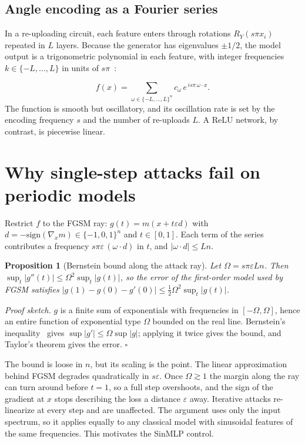 \documentclass[11pt]{article}
\newtheorem{proposition}{Proposition}
\begin{document}
\subsection{Angle encoding as a Fourier series}
In a re-uploading circuit, each feature enters through rotations $R_Y(s\pi x_i)$ repeated in $L$ layers. Because the generator has eigenvalues $\pm 1/2$, the model output is a trigonometric polynomial in each feature, with integer frequencies $k\in\{-L,\dots,L\}$ in units of $s\pi$~\cite{schuld2021}:

\begin{equation}
f(x)=\sum_{\omega\in\{-L,\dots,L\}^n} c_\omega\, e^{\,i s\pi\, \omega\cdot x}.
\end{equation}
The function is smooth but oscillatory, and its oscillation rate is set by the encoding frequency $s$ and the number of re-uploads $L$. A ReLU network, by contrast, is piecewise linear.

\section{Why single-step attacks fail on periodic models}\label{sec:theory}
Restrict $f$ to the FGSM ray: $g(t)=m(x+t\varepsilon d)$ with $d=-\mathrm{sign}(\nabla_x m)\in\{-1,0,1\}^n$ and $t\in[0,1]$. Each term of the series contributes a frequency $s\pi\varepsilon\,(\omega\cdot d)$ in $t$, and $|\omega\cdot d|\leq Ln$.

\begin{proposition}[Bernstein bound along the attack ray]
Let $\Omega=s\pi\varepsilon L n$. Then $\sup_t|g''(t)|\leq\Omega^2\sup_t|g(t)|$, so the error of the first-order model used by FGSM satisfies $|g(1)-g(0)-g'(0)|\leq\tfrac{1}{2}\Omega^2\sup_t|g(t)|$.
\end{proposition}
\emph{Proof sketch.} $g$ is a finite sum of exponentials with frequencies in $[-\Omega,\Omega]$, hence an entire function of exponential type $\Omega$ bounded on the real line. Bernstein's inequality~\cite{boas1954} gives $\sup|g'|\leq\Omega\sup|g|$; applying it twice gives the bound, and Taylor's theorem gives the error. $\square$

The bound is loose in $n$, but its scaling is the point. The linear approximation behind FGSM degrades quadratically in $s\varepsilon$. Once $\Omega\gtrsim 1$ the margin along the ray can turn around before $t=1$, so a full step overshoots, and the sign of the gradient at $x$ stops describing the loss a distance $\varepsilon$ away. Iterative attacks re-linearize at every step and are unaffected. The argument uses only the input spectrum, so it applies equally to any classical model with sinusoidal features of the same frequencies. This motivates the SinMLP control.
\end{document}
